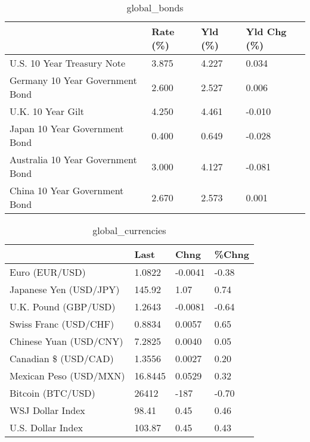 \documentclass{article}%
\begin{document}
%


\begin{table}[htbp]%
\caption{global\_bonds}%
\centering%
\begin{adjustbox}{width=1\textwidth}%
\begin{tabular}{llll}
\toprule
                                  & Rate (\%) & Yld (\%) & Yld Chg (\%) \\
\midrule
       U.S. 10 Year Treasury Note &    3.875 &   4.227 &       0.034 \\
  Germany 10 Year Government Bond &    2.600 &   2.527 &       0.006 \\
                U.K. 10 Year Gilt &    4.250 &   4.461 &      -0.010 \\
    Japan 10 Year Government Bond &    0.400 &   0.649 &      -0.028 \\
Australia 10 Year Government Bond &    3.000 &   4.127 &      -0.081 \\
    China 10 Year Government Bond &    2.670 &   2.573 &       0.001 \\
\bottomrule
\end{tabular}
%
\end{adjustbox}%
\end{table}

%


\begin{table}[htbp]%
\caption{global\_currencies}%
\centering%
\begin{adjustbox}{width=1\textwidth}%
\begin{tabular}{llll}
\toprule
                       &    Last &    Chng & \%Chng \\
\midrule
        Euro (EUR/USD) &  1.0822 & -0.0041 & -0.38 \\
Japanese Yen (USD/JPY) &  145.92 &    1.07 &  0.74 \\
  U.K. Pound (GBP/USD) &  1.2643 & -0.0081 & -0.64 \\
 Swiss Franc (USD/CHF) &  0.8834 &  0.0057 &  0.65 \\
Chinese Yuan (USD/CNY) &  7.2825 &  0.0040 &  0.05 \\
  Canadian \$ (USD/CAD) &  1.3556 &  0.0027 &  0.20 \\
Mexican Peso (USD/MXN) & 16.8445 &  0.0529 &  0.32 \\
     Bitcoin (BTC/USD) &   26412 &    -187 & -0.70 \\
      WSJ Dollar Index &   98.41 &    0.45 &  0.46 \\
     U.S. Dollar Index &  103.87 &    0.45 &  0.43 \\
\bottomrule
\end{tabular}
%
\end{adjustbox}%
\end{table}
\end{document}

